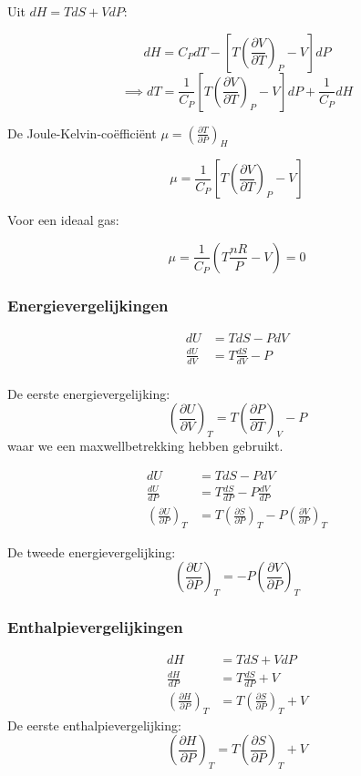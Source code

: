 Uit \(dH = TdS + VdP\):

\[
dH = C_P dT - \left[ T\left(\frac{\partial V}{\partial T}\right)_P - V \right] dP
\]
\[
\implies dT = \frac{1}{C_P}\left[ T\left(\frac{\partial V}{\partial T}\right)_P - V \right] dP + \frac{1}{C_P}dH
\]

De Joule-Kelvin-coëfficiënt \(\mu = \left(\frac{\partial T}{\partial P}\right)_H\)

\[\mu = \frac{1}{C_P}\left[ T\left(\frac{\partial V}{\partial T}\right)_P - V \right]\]

Voor een ideaal gas:

\[\mu = \frac{1}{C_P} \left( T\frac{nR}{P} - V \right) = 0\]

\subsubsection{Energievergelijkingen}

\begin{align*}
    dU &= TdS - PdV \\
    \frac{dU}{dV} &= T \frac{d S}{d V}- P \\
\end{align*}

De eerste energievergelijking:
\[
\boxed{\left(\frac{\partial U}{\partial V}\right)_T = T \left(\frac{\partial P}{\partial T}\right)_V - P}
\]
waar we een maxwellbetrekking hebben gebruikt.

\begin{align*}
    dU &= TdS - PdV \\
    \frac{dU}{dP} &= T \frac{d S}{d P}- P \frac{dV}{dP} \\
    \left(\frac{\partial U}{\partial P}\right)_T &= T \left(\frac{\partial S}{\partial P}\right)_T - P \left(\frac{\partial V}{\partial P}\right)_T
\end{align*}

De tweede energievergelijking:
\[
\boxed{\left(\frac{\partial U}{\partial P}\right)_T = -P \left(\frac{\partial V}{\partial P}\right)_T}
\]

\subsubsection{Enthalpievergelijkingen}

\begin{align*}
dH &= TdS + VdP \\
\frac{dH}{dP} &= T \frac{d S}{d P}+ V  \\
\left(\frac{\partial H}{\partial P}\right)_T &= T \left(\frac{\partial S}{\partial P}\right)_T + V
\end{align*}
De eerste enthalpievergelijking:
\[\boxed{\left(\frac{\partial H}{\partial P}\right)_T = T \left(\frac{\partial S}{\partial P}\right)_T + V}\]

